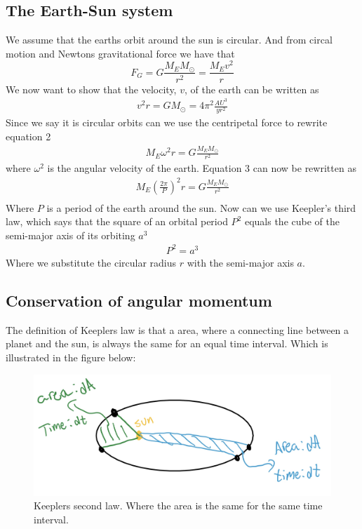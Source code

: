 \documentclass{article}
\begin{document}
\begin{multicols}{2}
\subsection{The Earth-Sun system}
We assume that the earths orbit around the sun is circular. And from circal motion and Newtons gravitational force we have that
\begin{equation}
    F_G=G\frac{M_EM_{\odot}}{r^2}=\frac{M_Ev^2}{r}
\end{equation}
We now want to show that the velocity, $v$, of the earth can be written as
\begin{align}
    v^2r=GM_{\odot}=4\pi^2\frac{AU^3}{yr^2}
\end{align}
Since we say it is circular orbits  can we use the centripetal force to rewrite equation 2 
\begin{align}
    M_E\omega^2r=G\frac{M_EM_{\odot}}{r^2}
\end{align}
where $\omega^2$ is the angular velocity of the earth. Equation 3 can now be rewritten as 
\begin{align}
    M_E(\frac{2\pi}{P})^2r=G\frac{M_EM_{\odot}}{r^2}\\
\end{align}
Where $P$ is a period of the earth around the sun.
Now can we use Keepler's third law, which says that the square of an orbital period $P^2$ equals the cube of the semi-major axis of its orbiting $a^3$
\begin{align}
    P^2=a^3
\end{align}
Where we substitute the circular radius $r$ with the semi-major axis $a$. 

\subsection{Conservation of angular momentum}
The definition of Keeplers law is that a area, where a connecting line between a planet and the sun, is always the same for an equal time interval. Which is illustrated in the figure below:


\begin{figure}[H]
	\centering
	\includegraphics[width=\linewidth]{K2L.jpg}
	\caption{Keeplers second law. Where the area is the same for the same time interval.}
	\label{fig:1bplot}
\end{figure}


\end{multicols}
\end{document}
